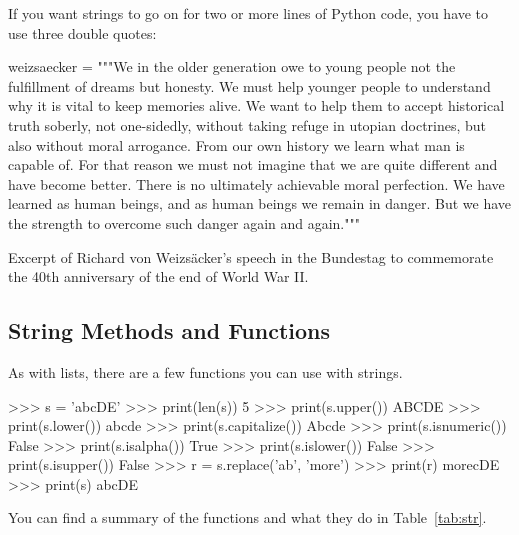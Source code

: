 \documentclass[11pt]{cselabheader}
\begin{document}
If you want strings to go on for two or more lines of Python code, you have to use three double
quotes:

\begin{listing}[H]
  \vspace{-0.5em}
\begin{python3code}
weizsaecker = """We in the older generation owe to young people not the
fulfillment of dreams but honesty. We must help younger people to
understand why it is vital to keep memories alive. We want to help them
to accept historical truth soberly, not one-sidedly, without taking
refuge in utopian doctrines, but also without moral arrogance. From our
own history we learn what man is capable of. For that reason we must not
imagine that we are quite different and have become better. There is no
ultimately achievable moral perfection. We have learned as human beings,
and as human beings we remain in danger. But we have the strength to
overcome such danger again and again."""
\end{python3code}
  \vspace{-1em}
  \caption{Excerpt of Richard von Weizs\"{a}cker's speech in
the Bundestag to commemorate the 40th anniversary of the end of World War II.}
  \vspace{-0.5em}
\end{listing}

\subsection{String Methods and Functions}

As with lists, there are a few functions you can use with strings.

\begin{pyconcode}
>>> s = 'abcDE'
>>> print(len(s))
5
>>> print(s.upper())
ABCDE
>>> print(s.lower())
abcde
>>> print(s.capitalize())
Abcde
>>> print(s.isnumeric())
False
>>> print(s.isalpha())
True
>>> print(s.islower())
False
>>> print(s.isupper())
False
>>> r = s.replace('ab', 'more')
>>> print(r)
morecDE
>>> print(s)
abcDE
\end{pyconcode}

You can find a summary of the functions and what they do in Table~\ref{tab:str}.
\end{document}
